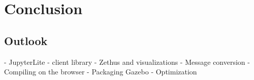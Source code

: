 \chapter{Conclusion}

\section{Outlook}

- JupyterLite
- client library
- Zethus and visualizations
- Message conversion
- Compiling on the browser
- Packaging Gazebo
- Optimization